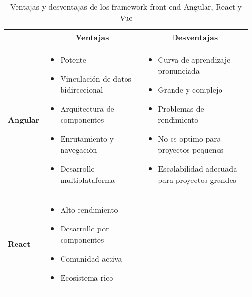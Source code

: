 \begin{spacing}{1}
    \begin{center}
        \renewcommand*{\arraystretch}{1.4}
        \begin{longtable}[c]{ |>{\bfseries}p{} |p{} |p{}|    }
            \caption[Ventajas y desventajas de los framework front-end Angular, React y Vue]{ Ventajas y desventajas de los framework front-end Angular, React y Vue\cite{universitat_politecnica_de_valencia_universitat_2014} }\label{tab:table_angular_react_vue_ventajas_desventajas} \\
            \hline
            \multicolumn{1}{|c|}{ \textbf{Framework}} & \multicolumn{1}{c|}{\textbf{Ventajas}} & \multicolumn{1}{c|}{ \textbf{Desventajas}} \\
            \hline
            Angular & \begin{itemize}
                          \item Potente
                          \item Vinculación de datos bidireccional
                          \item Arquitectura de componentes
                          \item Enrutamiento y navegación
                          \item Desarrollo multiplataforma
            \end{itemize}
            & \begin{itemize}
                  \item Curva de aprendizaje pronunciada
                  \item Grande y complejo
                  \item Problemas de rendimiento
                  \item No es optimo para proyectos pequeños
                  \item Escalabilidad adecuada para proyectos grandes
            \end{itemize} \\
            \hline
            React & \begin{itemize}
                        \item Alto rendimiento
                        \item Desarrollo por componentes
                        \item Comunidad activa
                        \item Ecosistema rico
            \end{itemize}

\end{longtable}
\end{center}
\end{spacing}
